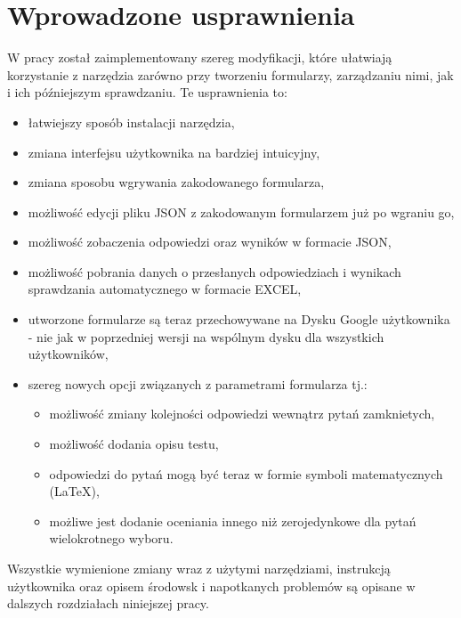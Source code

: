 \section{Wprowadzone usprawnienia}
W pracy został zaimplementowany szereg modyfikacji, które ułatwiają korzystanie z narzędzia
zarówno przy tworzeniu formularzy, zarządzaniu nimi, jak i ich późniejszym sprawdzaniu. Te usprawnienia to:
\begin{itemize}
  \item łatwiejszy sposób instalacji narzędzia,
  \item zmiana interfejsu użytkownika na bardziej intuicyjny,
  \item zmiana sposobu wgrywania zakodowanego formularza,
  \item możliwość edycji pliku JSON z zakodowanym formularzem już po wgraniu go,
  \item możliwość zobaczenia odpowiedzi oraz wyników w formacie JSON,
  \item możliwość pobrania danych o przesłanych odpowiedziach 
   i wynikach sprawdzania automatycznego w formacie EXCEL,
  \item utworzone formularze są teraz przechowywane na Dysku Google użytkownika 
  - nie jak w poprzedniej wersji na wspólnym dysku dla wszystkich użytkowników,
  \item szereg nowych opcji związanych z parametrami formularza tj.:
  \begin{itemize}
    \item możliwość zmiany kolejności odpowiedzi wewnątrz pytań zamknietych,
    \item możliwość dodania  opisu testu,
    \item odpowiedzi do pytań mogą być teraz w formie symboli  matematycznych (\LaTeX),
    \item możliwe jest dodanie oceniania innego niż zerojedynkowe dla pytań
     wielokrotnego wyboru.
  \end{itemize}  
\end{itemize}

Wszystkie wymienione zmiany wraz z użytymi narzędziami, instrukcją użytkownika oraz opisem
środowsk i napotkanych problemów są opisane w dalszych rozdziałach niniejszej pracy. 

